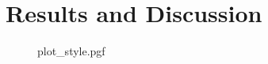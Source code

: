 \chapter{Results and Discussion}\label{sec:results}

\begin{figure}
    \centering
    {plot_style.pgf}
\end{figure}